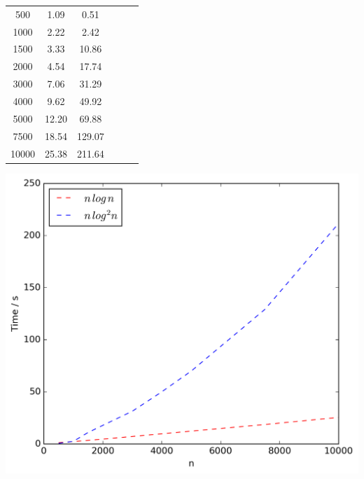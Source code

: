 \documentclass{article}
\begin{document}
\begin{table}[!ht]
\begin{minipage}{0.48\textwidth}
\begin{tabular}{c||ccccc}
                \hline\hline
                500 & 1.09 & 0.51\\
                1000 & 2.22 & 2.42\\
                1500 & 3.33 & 10.86\\
                2000 & 4.54 & 17.74\\
                3000 & 7.06 & 31.29\\
                4000 & 9.62 & 49.92\\
                5000 & 12.20 & 69.88\\
                7500 & 18.54 & 129.07\\
                10000 & 25.38 & 211.64\\
            \end{tabular}
            \includegraphics[scale=0.4]{varyingn1_filter}
        \end{minipage}
        \label{fig:expresults1}
    \end{table}
\end{document}
